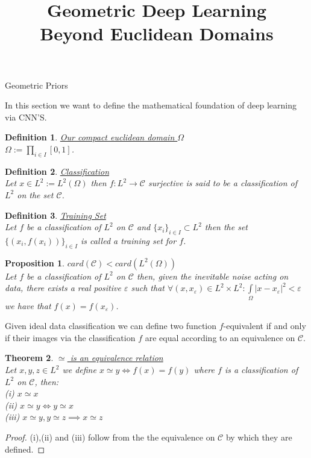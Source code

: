\documentclass{article}
\title{Geometric Deep Learning \\ Beyond Euclidean Domains}
\author{}
\date{}
\newtheorem{thm}{Theorem}[section]
\newtheorem{prop}[thm]{Proposition}
\newtheorem{defn}{Definition}[section]
\newcommand{\eps}{\varepsilon}
\begin{document}
\maketitle
\begin{section}{Geometric Priors}

In this section we want to define the mathematical foundation of deep learning via CNN'S.

\begin{defn}\underline{Our compact euclidean domain $\Omega$}\\
$\Omega := \prod_{i \in I}[0,1]$.
\end{defn}

\begin{defn}\underline{Classification}\\
Let $x \in L^2 := L^2(\Omega)$ then $f : L^2 \to \mathcal{C}$ surjective
is said to be a classification of $L^2$ on the set $\mathcal{C}$.
\end{defn}

\begin{defn}\underline{Training Set}\\
Let $f$ be a classification of $L^2$ on $\mathcal{C}$ and $\{x_i\}_{i \in I}\subset L^2$
then the set $\{(x_i,f(x_i))\}_{i \in I}$ is called a training set for $f$.
\end{defn}

\begin{prop}\underline{$card(\mathcal{C})<card(L^2(\Omega))$}\\
Let $f$ be a classification of $L^2$ on $\mathcal{C}$ then, given the inevitable noise acting on data,
there exists a real positive $\eps$ such that $\forall (x,x_\eps) \in L^2\times L^2: \int\limits_\Omega{|x-x_\eps|^2}<\eps$
we have that $f(x)=f(x_\eps)$.
\end{prop}

Given ideal data classification we can define two function $f$-equivalent if and only if 
their images via the classification $f$ are equal according to an equivalence on $\mathcal{C}$.

\begin{thm}\underline{$\simeq$ is an equivalence relation}\\
Let $x,y,z \in L^2$ we define $x\simeq y \iff f(x)=f(y)$ where $f$ is a classification of $L^2$ on $\mathcal{C}$,
then:\\
(i) $x \simeq x$\\
(ii) $x \simeq y \iff y \simeq x$\\
(iii) $x \simeq y, y \simeq z \implies x \simeq z$
\end{thm}
\begin{proof}
(i),(ii) and (iii) follow from the the equivalence on $\mathcal{C}$ by which they are defined.
\end{proof}



\end{section}
\end{document}
